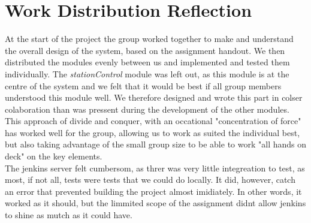 \section{Work Distribution Reflection}

At the start of the project the group worked together to make and understand the overall design of the system, based on the assignment handout. We then distributed the modules evenly between us and implemented and tested them individually. 
The \textit{stationControl} module was left out, as this module is at the centre of the system and we felt that it would be best if all group members understood this module well. We therefore designed and wrote this part in colser colaboration than was pressent during the development of the other modules.\\

This approach of divide and conquer, with an occational "concentration of force" has worked well for the group, allowing us to work as suited the individual best, but also taking advantage of the small group size to be able to work "all hands on deck" on the key elements.\\

The jenkins server felt cumbersom, as threr was very little integreation to test, as most, if not all, tests were tests that we could do locally. It did, however, catch an error that prevented building the project almost imidiately. In other words, it worked as it should, but the limmited scope of the assignment didnt allow jenkins to shine as mutch as it could have.\\


\newpage

